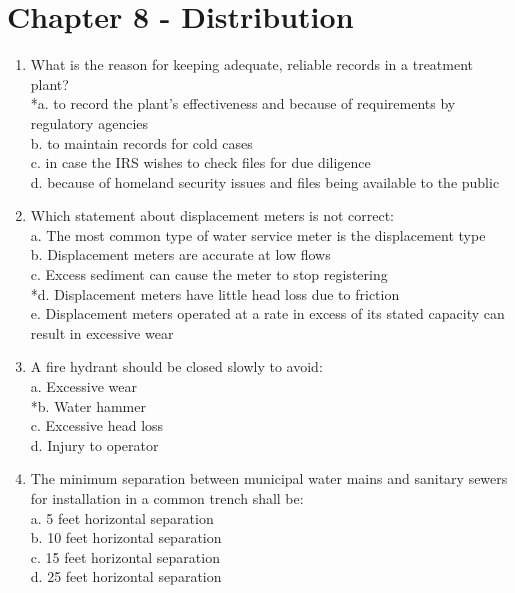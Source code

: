 \newpage





\section{Chapter 8 - Distribution}

\begin{enumerate}[1.]
\item What is the reason for keeping adequate, reliable records in a treatment plant?\\
*a. to record the plant's effectiveness and because of requirements by regulatory agencies\\
b. to maintain records for cold cases\\
c. in case the IRS wishes to check files for due diligence\\
d. because of homeland security issues and files being available to the public\\
\item Which statement about displacement meters is not correct:\\
a. The most common type of water service meter is the displacement type\\
b. Displacement meters are accurate at low flows\\
c. Excess sediment can cause the meter to stop registering\\
*d. Displacement meters have little head loss due to friction\\
e. Displacement meters operated at a rate in excess of its stated capacity can result in excessive wear\\
\item A fire hydrant should be closed slowly to avoid:\\
a. Excessive wear\\
*b. Water hammer\\
c. Excessive head loss\\
d. Injury to operator\\
\item The minimum separation between municipal water mains and sanitary sewers for installation in a common trench shall be:\\
a. 5 feet horizontal separation\\
b. 10 feet horizontal separation\\
c. 15 feet horizontal separation\\
d. 25 feet horizontal separation\\

\end{enumerate}
